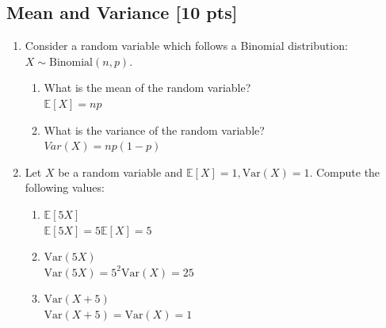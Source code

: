 \documentclass[a4paper]{article}
\theoremstyle{definition}
\newcommand{\Var}{\mathrm{Var}}
\newenvironment{soln}{
	\leavevmode\color{blue}\ignorespaces
}{}
\begin{document}
	\subsection{Mean and Variance [10 pts]}
	\begin{enumerate}
		\item Consider a random variable which follows a Binomial
		distribution: $X \sim \text{Binomial}(n, p)$.
		\begin{enumerate}
			\item What is the mean of the random variable?\\
			\begin{soln} $\mathbb{E}[X] = np$ \end{soln}
			\item What is the variance of the random variable?\\
			\begin{soln} $Var(X) = np(1-p)$ \end{soln}
		\end{enumerate}
		
		\item Let $X$ be a random variable and
		$\mathbb{E}[X] = 1, \Var(X) = 1$. Compute the following values:
		\begin{enumerate}
			\item $\mathbb{E}[5X]$\\
			\begin{soln} $\mathbb{E}[5X] = 5\mathbb{E}[X] = 5$ \end{soln}
			\item $\Var(5X)$\\
			\begin{soln} $\Var(5X) = 5^{2}\Var(X) = 25$ \end{soln}
			\item $\Var(X+5)$\\
			\begin{soln} $\Var(X+5) = \Var(X) = 1$ \end{soln}
		\end{enumerate}
	\end{enumerate}
	
	
\end{document}
